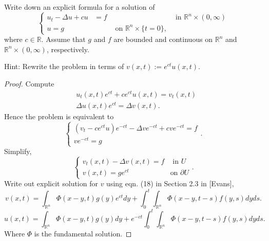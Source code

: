 \begin{problem}
	Write down an explicit formula for a solution of
\[
\left\{\begin{array}{rlrl}
u_t-\Delta u+c u & =f & & \text { in } \mathbb{R}^n \times(0, \infty) \\
u=g & & \text { on } \mathbb{R}^n \times\{t=0\},
\end{array}\right.
\]
where $c \in \mathbb{R}$. Assume that $g$ and $f$ are bounded and continuous on $\mathbb{R}^n$ and $\mathbb{R}^n \times(0, \infty)$, respectively.

Hint: Rewrite the problem in terms of $v(x, t):=e^{c t} u(x, t)$.
\end{problem}
\begin{proof}
	Compute
	\begin{align*}
		&u_t(x,t) e^{ct } + c e^{ct} u(x,t) = v_t (x,t) \\
		& \Delta u(x,t) e^{ct } = \Delta v(x,t)
	.\end{align*}
	Hence the problem is equivalent to
	\[
		\begin{cases}
			\left( v_t - c e^{c t} u \right)  e^{- c t} - \Delta v e^{- c t} + c v e^{- c t} = f \\
			v e ^{- c t} = g
		\end{cases}
	.\] 
	Simplify,
	\[
		\begin{cases}
			v_t(x,t) - \Delta v(x,t) = f & \text{ in }U\\
			v(x,t) = g e^{c t} & \text{on }\partial U
		\end{cases}
	.\] 
	Write out explicit solution for $v$ using eqn. (18) in Section 2.3 in [Evans],
	 \[
		v(x,t) = \int _{\mathbb{R}^n} \Phi(x-y,t) g(y) e^{ c t} d y + \int _0^t \int _{\mathbb{R}^n} \Phi(x-y, t -s) f(y,s) dy ds
	.\] 
	\[
		u(x,t) = \int _{\mathbb{R}^n} \Phi(x-y,t) g(y) d y + e^{ -  c t}\int _0^t \int _{\mathbb{R}^n} \Phi(x-y, t -s) f(y,s) dy ds
	.\] 
	Where $\Phi$ is the fundamental solution.
\end{proof}


